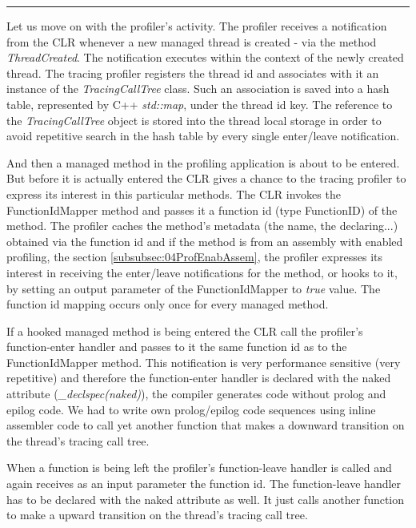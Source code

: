\begin{center}
\rule{300pt}{1.5pt}
\end{center}
Let us move on with the profiler's activity. The profiler receives a notification from the CLR whenever a new managed thread is created - via the method \textit{ThreadCreated}. The notification executes within the context of the newly created thread. The tracing profiler registers the thread id and associates with it an instance of the \textit{TracingCallTree} class. Such an association is saved into a hash table, represented by C++ \textit{std::map}, under the thread id key. The reference to the \textit{TracingCallTree} object is stored into the thread local storage in order to avoid repetitive search in the hash table by every single enter/leave notification.

And then a managed method in the profiling application is about to be entered. But before it is actually entered the CLR gives a chance to the tracing profiler to express its interest in this particular methods. The CLR invokes the FunctionIdMapper method and passes it a function id (type FunctionID) of the method. The profiler caches the method's metadata (the name, the declaring...) obtained via the function id and if the method is from an assembly with enabled profiling, the section \ref{subsubsec:04ProfEnabAssem}, the profiler expresses its interest in receiving the enter/leave notifications for the method,  or hooks to it, by setting an output parameter of the FunctionIdMapper to \textit{true} value. The function id mapping occurs only once for every managed method.

If a hooked managed method is being entered the CLR call the profiler's function-enter handler and passes to it the same function id as to the FunctionIdMapper method. This notification is very performance sensitive (very repetitive) and therefore the function-enter handler is declared with the naked attribute (\textit{\_declspec(naked)}), the compiler generates code without prolog and epilog code. We had to write own prolog/epilog code sequences using inline assembler code to call yet another function that makes a downward transition on the thread's tracing call tree.

When a function is being left the profiler's function-leave handler is called and again receives as an input parameter the function id. The function-leave handler has to be declared with the naked attribute as well. It just calls another function to make a upward transition on the thread's tracing call tree.


